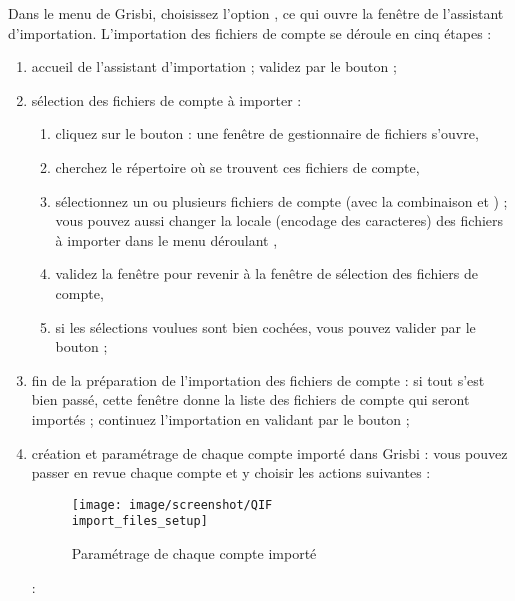Dans le menu  de Grisbi, choisissez l'option , ce qui ouvre la fenêtre de l'assistant d'importation. L'importation des fichiers de compte se déroule en cinq étapes :

\begin{enumerate}
	\item accueil de l'assistant d'importation ; validez par le bouton  ;
	\item sélection des fichiers de compte à importer :	
		\begin{enumerate}
			\item cliquez sur le bouton  : une fenêtre de gestionnaire de fichiers s'ouvre,	
			\item cherchez le répertoire où se trouvent ces fichiers de compte,
			\item sélectionnez un ou plusieurs fichiers de compte (avec la combinaison   et ) ; vous pouvez aussi changer la \gls{locale} (\gls{encodage des caracteres}) des fichiers à importer dans le menu déroulant ,
			\item validez la fenêtre pour revenir à la fenêtre de sélection des fichiers de compte,
			\item si les sélections voulues sont bien cochées, vous pouvez valider par le bouton  ;
		\end{enumerate}		  
	\item fin de la préparation de l'importation des fichiers de compte : si tout s'est bien passé, cette fenêtre donne la liste des fichiers de compte qui seront importés ; continuez l'importation en validant par le bouton  ;
	\item création et paramétrage de chaque compte importé dans Grisbi : vous pouvez passer en revue chaque compte et y choisir les actions suivantes \ifIllustration {} :
	\begin{figure}[htbp]
	\begin{center}
	\texttt{[image: image/screenshot/QIF\\import\_files\_setup]}
	\end{center}
	\caption{Paramétrage de chaque compte importé}
	\label{QIF-import-files-setup-img}
	\end{figure}
	\else  :
	\fi
	

\end{enumerate}
